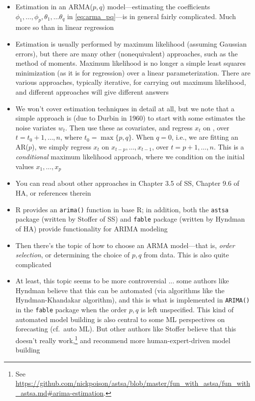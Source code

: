 \documentclass{article}
\begin{document}
\begin{itemize}
\item Estimation in an ARMA($p,q$) model---estimating the coefficients
  $\phi_1,\dots,\phi_p,\theta_1,\dots\theta_q$ in \eqref{eq:arma_pq}---is in 
  general fairly complicated. Much more so than in linear regression 

\item Estimation is usually performed by maximum likelihood (assuming Gaussian
  errors), but there are many other (nonequivalent) approaches, such as the
  method of moments. Maximum likelihood is no longer a simple least squares 
  minimization (as it is for regression) over a linear parameterization. There
  are various approaches, typically iterative, for carrying out maximum
  likelihood, and different approaches will give different answers     

\item We won't cover estimation techniques in detail at all, but we note that a
  simple approach is (due to Durbin in 1960) to start with some estimates
   the noise variates $w_t$. Then use these as covariates, 
  and regress $x_t$ on
  , over $t = 
  t_0+1,\dots,n$, where $t_0 = \max\{p,q\}$. When $q = 0$, i.e., we are fitting
  an AR($p$), we simply regress $x_t$ on $x_{t-p},\dots,x_{t-1}$, over $t = 
  p+1,\dots,n$. This is a \emph{conditional} maximum likelihood approach, where
  we condition on the initial values $x_1,\dots,x_p$   

\item You can read about other approaches in Chapter 3.5 of SS, Chapter 9.6 of
  HA, or references therein  

\item R provides an \verb|arima()| function in base R; in addition, both the
  \verb|astsa| package (written by Stoffer of SS) and \verb|fable| package
  (written by Hyndman of HA) provide functionality for ARIMA modeling

\item Then there's the topic of how to choose an ARMA model---that is,
  \emph{order selection}, or determining the choice of $p,q$ from data. This is
  also quite complicated   

\item At least, this topic seems to be more controversial ... some authors like
  Hyndman believe that this can be automated (via algorithms like the
  Hyndman-Khandakar algorithm), and this is what is implemented in
  \verb|ARIMA()| in the \verb|fable| package when the order $p,q$ is left 
  unspecified. This kind of automated model building is also central to some ML 
  perspectives on forecasting (cf.\ auto ML). But other authors like Stoffer
  believe that this doesn't really work,\footnote{See
    \url{https://github.com/nickpoison/astsa/blob/master/fun_with_astsa/fun_with_astsa.md\#arima-estimation}.}  
  and recommend more human-expert-driven model building  


\end{itemize}
\end{document}
